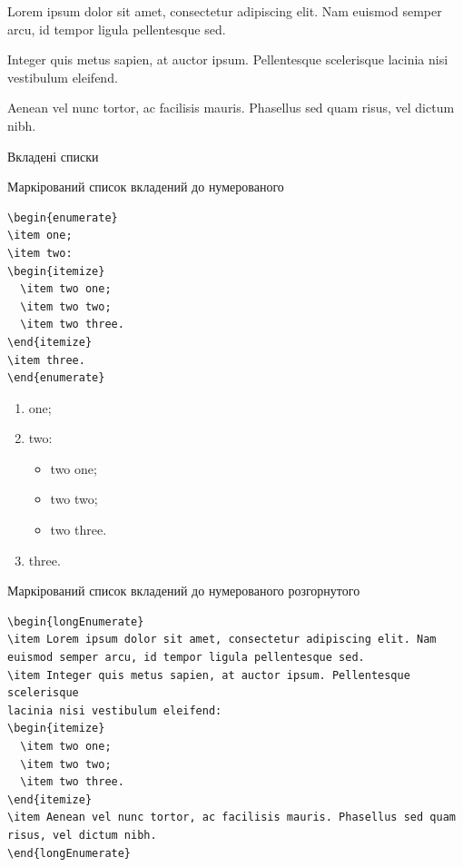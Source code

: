 \begin{longEnumerate}
\item Lorem ipsum dolor sit amet, consectetur adipiscing elit. Nam euismod semper arcu, id tempor ligula pellentesque sed. 
\item Integer quis metus sapien, at auctor ipsum. Pellentesque scelerisque lacinia nisi vestibulum eleifend. 
\item Aenean vel nunc tortor, ac facilisis mauris. Phasellus sed quam risus, vel dictum nibh.
\end{longEnumerate}

Вкладені списки

Маркірований список вкладений до нумерованого

\begin{lstlisting}
\begin{enumerate}
\item one;
\item two:
\begin{itemize}
  \item two one;
  \item two two;
  \item two three.
\end{itemize}
\item three.
\end{enumerate}
\end{lstlisting}

\begin{enumerate}
\item one;
\item two:
\begin{itemize}
  \item two one;
  \item two two;
  \item two three.
\end{itemize}
\item three.
\end{enumerate}

Маркірований список вкладений до нумерованого розгорнутого

\begin{lstlisting}
\begin{longEnumerate}
\item Lorem ipsum dolor sit amet, consectetur adipiscing elit. Nam euismod semper arcu, id tempor ligula pellentesque sed. 
\item Integer quis metus sapien, at auctor ipsum. Pellentesque scelerisque
lacinia nisi vestibulum eleifend:
\begin{itemize}
  \item two one;
  \item two two;
  \item two three.
\end{itemize}
\item Aenean vel nunc tortor, ac facilisis mauris. Phasellus sed quam risus, vel dictum nibh.
\end{longEnumerate}
\end{lstlisting}

